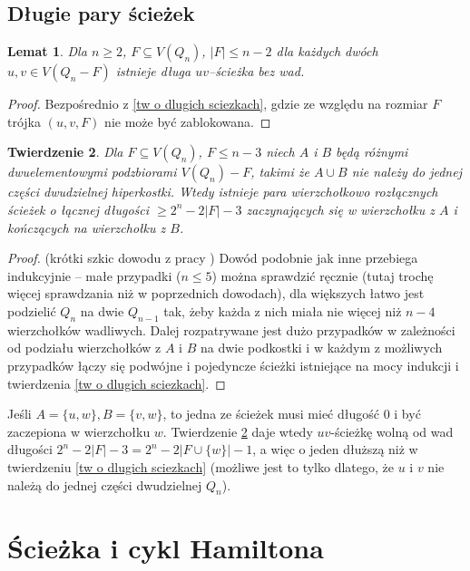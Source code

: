 \documentclass{pracamgr}
\newtheorem{theorem}{Twierdzenie}[chapter]
\newtheorem{lemma}[theorem]{Lemat}
\begin{document}
  \section{Długie pary ścieżek}
   \begin{lemma}\label{zawsze dlugie sciezki}
    Dla $n\ge2$, $F\subseteq V(Q_n)$, $|F|\le n-2$ dla każdych dwóch $u,v\in V(Q_n-F)$ istnieje długa $uv$--ścieżka bez wad.
   \end{lemma}
   \begin{proof}
    Bezpośrednio z \ref{tw o dlugich sciezkach}, gdzie ze względu na rozmiar $F$ trójka $(u,v,F)$ nie może być zablokowana.
   \end{proof}
   \begin{theorem}\label{pary sciezek}
    Dla $F\subseteq V(Q_n)$, $F\le n-3$ niech $A$ i $B$ będą różnymi dwuelementowymi podzbiorami $V(Q_n)-F$, takimi że $A\cup B$ nie należy do
    jednej części dwudzielnej hiperkostki. Wtedy istnieje para wierzchołkowo rozłącznych
    ścieżek o łącznej długości $\ge 2^n-2|F|-3$ zaczynających się w wierzchołku z $A$ i kończących na wierzchołku z $B$.
   \end{theorem}
   \begin{proof}
   (krótki szkic dowodu z pracy \cite{FG2})\newline
    Dowód podobnie jak inne przebiega indukcyjnie -- małe przypadki ($n\le 5$) można sprawdzić ręcznie (tutaj trochę więcej sprawdzania niż w poprzednich dowodach),
    dla większych łatwo jest podzielić $Q_n$ na dwie $Q_{n-1}$ tak, żeby każda z nich miała nie więcej niż $n-4$ wierzchołków wadliwych.
    Dalej rozpatrywane jest dużo przypadków w zależności od podziału wierzchołków z $A$ i $B$ na dwie podkostki i w każdym z możliwych przypadków łączy się
    podwójne i pojedyncze ścieżki istniejące na mocy indukcji i twierdzenia \ref{tw o dlugich sciezkach}.
   \end{proof}
    Jeśli $A=\{u,w\}, B=\{v,w\}$, to jedna ze ścieżek musi mieć długość $0$ i być zaczepiona w wierzchołku $w$.
    Twierdzenie \ref{pary sciezek} daje wtedy $uv$-ścieżkę
    wolną od wad długości $2^n-2|F|-3=2^n-2|F\cup\{w\}|-1$, a więc o jeden dłuższą niż w twierdzeniu \ref{tw o dlugich sciezkach}
    (możliwe jest to tylko dlatego, że $u$ i $v$ nie należą do jednej części dwudzielnej $Q_n$).
   
 \chapter{Ścieżka i cykl Hamiltona}\label{Ham}
\end{document}
